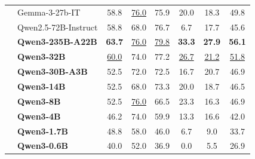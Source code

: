 \documentclass[dvipsnames]{article}
\begin{document}
\begin{table}[tbp]
{\begin{tabular}{clcccccc}
 & Gemma-3-27b-IT & 58.8 & \underline{76.0} & 75.9 & 20.0 & 18.3 & 49.8 \\
 & Qwen2.5-72B-Instruct & 58.8 & 68.0 & 76.7 & 6.7 & 17.7 & 45.6 \\
 & \textbf{Qwen3-235B-A22B} & \textbf{63.7} & \underline{76.0} & \underline{79.8} & \textbf{33.3} & \textbf{27.9} & \textbf{56.1} \\
 & \textbf{Qwen3-32B} & \underline{60.0} & 74.0 & 77.2 & \underline{26.7} & \underline{21.2} & \underline{51.8} \\
 & \textbf{Qwen3-30B-A3B} & 52.5 & 72.0 & 72.5 & 16.7 & 20.7 & 46.9 \\
 & \textbf{Qwen3-14B} & 52.5 & 68.0 & 73.3 & 20.0 & 18.7 & 46.5 \\
 & \textbf{Qwen3-8B} & 52.5 & \underline{76.0} & 66.5 & 23.3 & 16.3 & 46.9 \\
 & \textbf{Qwen3-4B} & 46.2 & 74.0 & 59.9 & 13.3 & 16.6 & 42.0 \\
 & \textbf{Qwen3-1.7B} & 48.8 & 58.0 & 46.0 & 6.7 & 9.0 & 33.7 \\
 & \textbf{Qwen3-0.6B} & 40.0 & 52.0 & 36.9 & 0.0 & 5.5 & 26.9 \\
\bottomrule
\end{tabular}
}
\end{table}
\end{document}
